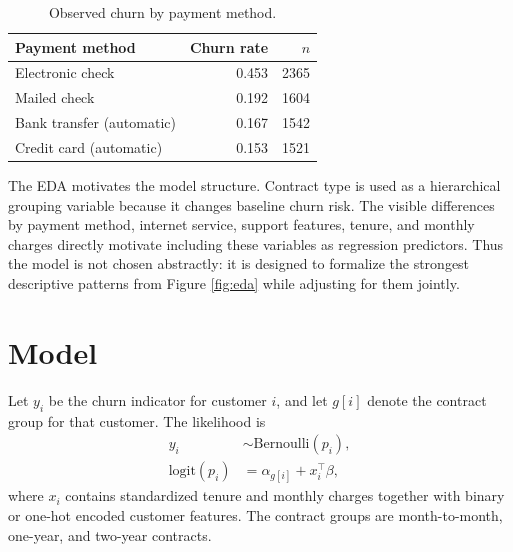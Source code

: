 \documentclass{article}
\begin{document}
\begin{table}[t]
\centering
\caption{Observed churn by payment method.}
\begin{tabular}{lrr}
\toprule
Payment method & Churn rate & $n$ \\
\midrule
Electronic check & 0.453 & 2365 \\
Mailed check & 0.192 & 1604 \\
Bank transfer (automatic) & 0.167 & 1542 \\
Credit card (automatic) & 0.153 & 1521 \\
\bottomrule
\end{tabular}
\end{table}

The EDA motivates the model structure. Contract type is used as a hierarchical grouping variable because it changes baseline churn risk. The visible differences by payment method, internet service, support features, tenure, and monthly charges directly motivate including these variables as regression predictors. Thus the model is not chosen abstractly: it is designed to formalize the strongest descriptive patterns from Figure \ref{fig:eda} while adjusting for them jointly.

\section{Model}

Let $y_i$ be the churn indicator for customer $i$, and let $g[i]$ denote the contract group for that customer. The likelihood is
\begin{align}
y_i &\sim \text{Bernoulli}(p_i),\\
\text{logit}(p_i) &= \alpha_{g[i]} + x_i^\top \beta,
\end{align}
where $x_i$ contains standardized tenure and monthly charges together with binary or one-hot encoded customer features. The contract groups are month-to-month, one-year, and two-year contracts.
\end{document}

